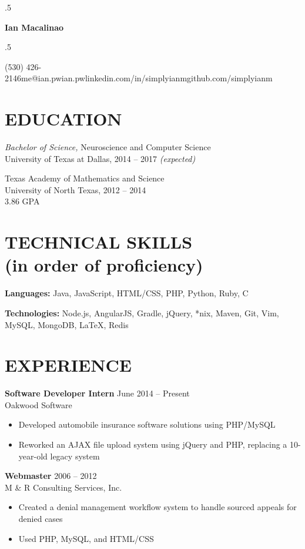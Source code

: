 \documentclass[margin, 10pt]{res} %
\newcommand*{\its}{\hspace{0.8cm}}
\begin{document}
\moveleft.5\hoffset\centerline{\Huge\bf Ian Macalinao}
\bigskip
\moveleft.5\hoffset\centerline{(530) 426-2146\its{}me@ian.pw\its{}ian.pw\its{}linkedin.com/in/simplyianm\its{}github.com/simplyianm}

\begin{resume}

  \section{EDUCATION}

  {\sl Bachelor of Science,} Neuroscience and Computer Science \\
  University of Texas at Dallas, 2014 -- 2017 \textit{(expected)}
  \medskip

  Texas Academy of Mathematics and Science \\
  University of North Texas, 2012 -- 2014 \\
  3.86 GPA

  \section{TECHNICAL SKILLS \\ \textnormal{(in order of proficiency)}} 

  {\bf Languages:} Java, JavaScript, HTML/CSS, PHP, Python, Ruby, C

  {\bf Technologies:} Node.js, AngularJS, Gradle, jQuery, *nix, Maven, Git, Vim, MySQL, MongoDB, \LaTeX, Redis

  \section{EXPERIENCE}

  {\bf Software Developer Intern} \hfill June 2014 -- Present \\
  Oakwood Software

  \begin{itemize} \itemsep -2pt
    \item Developed automobile insurance software solutions using PHP/MySQL
    \item Reworked an AJAX file upload system using jQuery and PHP, replacing a 10-year-old legacy system
  \end{itemize}

  {\bf Webmaster} \hfill 2006 -- 2012 \\
  M \& R Consulting Services, Inc.
  \begin{itemize} \itemsep -2pt
    \item Created a denial management workflow system to handle sourced appeals for denied cases
    \item Used PHP, MySQL, and HTML/CSS
  \end{itemize} 


\end{resume}
\end{document}
